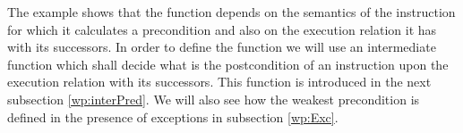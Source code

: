The example shows that the function \fwpi{} depends  on the semantics of the instruction 
for which it calculates a precondition and also on the execution relation it has with its successors.
In order to define the function \fwpi{} we will use an intermediate function which shall decide 
what is the postcondition of an instruction  upon the execution relation with its successors. This function 
is introduced in the next subsection \ref{wp:interPred}.
 We will also see how the weakest precondition is defined in the presence of exceptions in subsection \ref{wp:Exc}.



